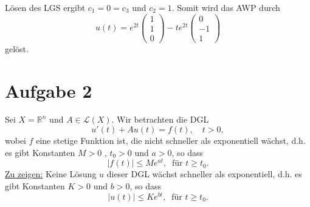 \documentclass[10pt,a4paper]{article}
\begin{document}
Lösen des LGS ergibt $c_1 = 0 = c_3$ und $c_2 = 1$. Somit wird das AWP durch
\begin{equation*}
	u(t) = e^{2t} \begin{pmatrix}1\\1\\0\end{pmatrix} - t e^{2t} \begin{pmatrix}0\\-1\\1\end{pmatrix}
\end{equation*}
gelöst.


\section*{Aufgabe 2}
Sei $X=\mathbb{R}^n$ und $A\in\mathcal{L}(X)$. Wir betrachten die DGL
\begin{equation*}
	u'(t) + Au(t) = f(t), \quad t>0,
\end{equation*}
wobei $f$ eine stetige Funktion ist, die nicht schneller als exponentiell wächst, d.h. es gibt Konstanten $M>0$ , $t_0 >0$ und $a>0$, so dass
\begin{equation}\label{kofu}
	|f(t)| \leq M e^{a t}, \ \text{ für } t \geq t_0.
\end{equation}
\underline{Zu zeigen:} Keine Lösung $u$ dieser DGL wächst schneller als exponentiell, d.h. es gibt Konstanten $K>0$ und $b>0$, so dass
\begin{equation*}
	|u(t)| \leq K e^{b t}, \ \text{ für } t \geq t_0.
\end{equation*}
\end{document}
